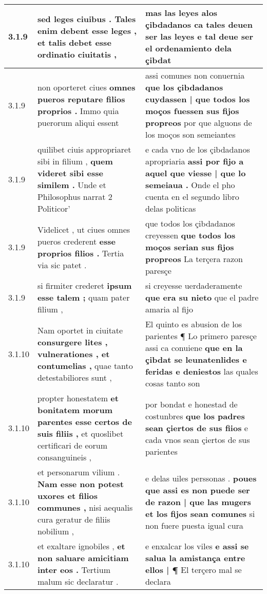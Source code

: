 \begin{tabular}{|p{1cm}|p{6.5cm}|p{6.5cm}|}
3.1.9 & sed leges ciuibus . \textbf{ Tales enim debent esse leges , } et talis debet esse ordinatio ciuitatis , & mas las leyes alos çibdadanos \textbf{ ca tales deuen ser las leyes } e tal deue ser el ordenamiento dela çibdat \\\hline
3.1.9 & non oporteret ciues \textbf{ omnes pueros reputare filios proprios . } Immo quia puerorum aliqui essent & assi comunes non conuernia \textbf{ que los çibdadanos cuydassen | que todos los moços fuessen sus fijos propreos } por que alguons de los moços son semeiantes \\\hline
3.1.9 & quilibet ciuis appropriaret sibi in filium , \textbf{ quem videret sibi esse similem . } Unde et Philosophus narrat 2 Politicor’ & e cada vno de los çibdadanos apropriaria \textbf{ assi por fijo a aquel que viesse | que lo semeiaua . } Onde el pho cuenta en el segundo libro delas politicas \\\hline
3.1.9 & Videlicet , ut ciues omnes pueros crederent \textbf{ esse proprios filios . } Tertia via sic patet . & que todos los çibdadanos creyessen \textbf{ que todos los moços serian sus fijos propreos } La terçera razon paresçe \\\hline
3.1.9 & si firmiter crederet \textbf{ ipsum esse talem ; } quam pater filium , & si creyesse uerdaderamente \textbf{ que era su nieto } que el padre amaria al fijo \\\hline
3.1.10 & Nam oportet in ciuitate \textbf{ consurgere lites , vulnerationes , et contumelias , } quae tanto detestabiliores sunt , & El quinto es abusion de los parientes ¶ Lo primero paresçe assi ca conuiene \textbf{ que en la çibdat se leunatenlides e feridas e deniestos } las quales cosas tanto son \\\hline
3.1.10 & propter honestatem \textbf{ et bonitatem morum parentes esse certos de suis filiis , } et quoslibet certificari de eorum consanguineis , & por bondat e honestad de costunbres \textbf{ que los padres sean çiertos de sus fiios } e cada vnos sean çiertos de sus parientes \\\hline
3.1.10 & et personarum vilium . \textbf{ Nam esse non potest uxores et filios communes , } nisi aequalis cura geratur de filiis nobilium , & e delas uiles perssonas . \textbf{ poues que assi es non puede ser de razon | que las mugers et los fijos sean comunes } si non fuere puesta igual cura \\\hline
3.1.10 & et exaltare ignobiles , \textbf{ et non saluare amicitiam inter eos . } Tertium malum sic declaratur . & e enxalcar los viles \textbf{ e assi se salua la amistança entre ellos | ¶ } El terçero mal se declara \\\hline

\end{tabular}

